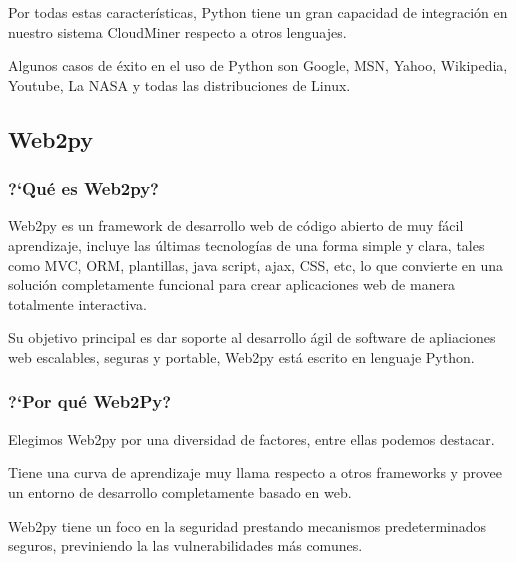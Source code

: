 Por todas estas caracter\'isticas, Python tiene un gran capacidad de integraci\'on en nuestro sistema CloudMiner respecto a otros lenguajes.

Algunos casos de \'exito en el uso de Python son Google, MSN, Yahoo, Wikipedia, Youtube, La NASA y todas las distribuciones de Linux.
\subsection{Web2py}
\subsubsection{?`Qu\'e es Web2py?}
Web2py es un framework de desarrollo web de c\'odigo abierto de muy f\'acil aprendizaje, incluye las últimas tecnolog\'ias de una forma simple y clara, tales como MVC, ORM, plantillas, java script, ajax, CSS, etc, lo que convierte en una soluci\'on completamente funcional para crear aplicaciones web de manera totalmente interactiva.

Su objetivo principal es dar soporte al desarrollo \'agil de software de apliaciones web escalables, seguras y portable, Web2py est\'a escrito en lenguaje Python.
\subsubsection{?`Por qu\'e Web2Py?}
Elegimos Web2py por una diversidad de factores, entre ellas podemos destacar.

Tiene una curva de aprendizaje muy llama respecto a otros frameworks y provee un entorno de desarrollo completamente basado en web.

Web2py tiene un foco en la seguridad prestando mecanismos predeterminados seguros, previniendo la las vulnerabilidades más comunes.








